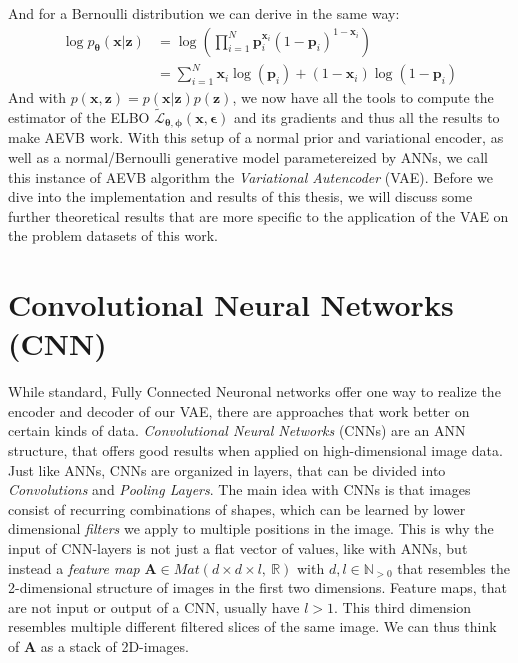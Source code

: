 \documentclass[12pt]{report}
\theoremstyle{definition}
\begin{document}
And for a Bernoulli distribution we can derive in the same way:
\begin{equation}
\begin{split}
\log p_{\pmb{\theta}}(\mathbf{x}|\mathbf{z})
& = \log \left(\prod_{i=1}^N \mathbf{p}_i^{\mathbf{x}_i}(1-\mathbf{p}_i)^{1-\mathbf{x}_i}\right) \\
& = \sum_{i=1}^N \mathbf{x}_i \log(\mathbf{p}_i) + (1 - \mathbf{x}_i) \log(1 - \mathbf{p}_i)
\end{split}
\end{equation}
And with $p(\mathbf{x}, \mathbf{z}) = p(\mathbf{x}|\mathbf{z})p(\mathbf{z})$, we now have all the tools to compute the estimator of the ELBO $\tilde{\mathcal{L}}_{\pmb{\theta}, \pmb{\phi}}(\mathbf{x}, \pmb{\epsilon})$ and its gradients and thus all the results to make AEVB work. With this setup of a normal prior and variational encoder, as well as a normal/Bernoulli generative model parametereized by ANNs, we call this instance of AEVB algorithm the \emph{Variational Autencoder} (VAE). Before we dive into the implementation and results of this thesis, we will discuss some further theoretical results that are more specific to the application of the VAE on the problem datasets of this work.


\section{Convolutional Neural Networks (CNN)}
While standard, Fully Connected Neuronal networks offer one way to realize the encoder and decoder of our VAE, there are approaches that work better on certain kinds of data. \emph{Convolutional Neural Networks} (CNNs) are an ANN structure, that offers good results when applied on high-dimensional image data. Just like ANNs, CNNs are organized in layers, that can be divided into \emph{Convolutions} and \emph{Pooling Layers}.
The main idea with CNNs is that images consist of recurring combinations of shapes, which can be learned by lower dimensional \emph{filters} we apply to multiple positions in the image. This is why the input of CNN-layers is not just a flat vector of values, like with ANNs, but instead a \emph{feature map} $\mathbf{A} \in Mat(d \times d \times l, \ \mathbb{R})$ with $d, l \in \mathbb{N}_{>0}$ that resembles the 2-dimensional structure of images in the first two dimensions. Feature maps, that are not input or output of a CNN, usually have $l>1$. This third dimension resembles multiple different filtered slices of the same image. We can thus think of $\mathbf{A}$ as a stack of 2D-images.
\end{document}
